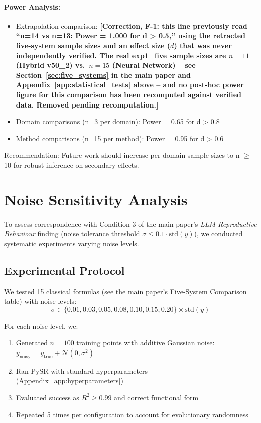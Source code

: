 \documentclass[twoside,11pt]{article}
\begin{document}
\paragraph{Power Analysis:}
\begin{itemize}
\item Extrapolation comparison: \textbf{[Correction, F-1: this line previously read ``n=14 vs n=13: Power = 1.000 for d > 0.5,'' using the retracted five-system sample sizes and an effect size ($d$) that was never independently verified. The real exp1\_five sample sizes are $n=11$ (Hybrid v50\_2) vs.\ $n=15$ (Neural Network) -- see Section~\ref{sec:five_systems} in the main paper and Appendix~\ref{app:statistical_tests} above -- and no post-hoc power figure for this comparison has been recomputed against verified data. Removed pending recomputation.]}
\item Domain comparisons (n=3 per domain): Power = 0.65 for d > 0.8
\item Method comparisons (n=15 per method): Power = 0.95 for d > 0.6
\end{itemize}

Recommendation: Future work should increase per-domain sample sizes to n $\geq$ 10 for robust inference on secondary effects.



\section{Noise Sensitivity Analysis}
\label{app:noise_sensitivity}

To assess correspondence with Condition 3 of the main paper's \emph{LLM Reproductive Behaviour} finding (noise tolerance threshold $\sigma \leq 0.1 \cdot \text{std}(y)$), we conducted systematic experiments varying noise levels.

\subsection{Experimental Protocol}

We tested 15 classical formulas (see the main paper's Five-System Comparison table) with noise levels:
\[
\sigma \in \{0.01, 0.03, 0.05, 0.08, 0.10, 0.15, 0.20\} \times \text{std}(y)
\]

For each noise level, we:
\begin{enumerate}
\item Generated $n = 100$ training points with additive Gaussian noise: $y_{\text{noisy}} = y_{\text{true}} + \mathcal{N}(0, \sigma^2)$
\item Ran PySR with standard hyperparameters (Appendix~\ref{app:hyperparameters})
\item Evaluated success as $R^2 \geq 0.99$ and correct functional form
\item Repeated 5 times per configuration to account for evolutionary randomness
\end{enumerate}
\end{document}
